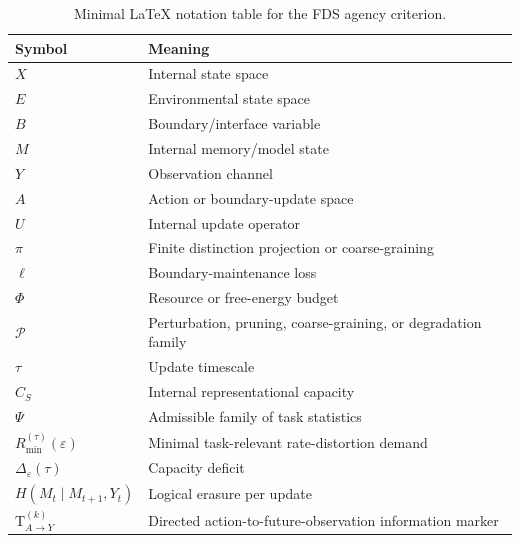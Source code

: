 \documentclass[10pt,a4paper,twocolumn,aps,prl]{revtex4-2}
\newcommand{\TE}{\mathrm{T}}
\begin{document}
\begin{table}[ht]
\centering
\small
\renewcommand{\arraystretch}{1.2}
\begin{tabular}{ll}
\toprule
\parbox[t]{2cm}{\raggedright\textbf{Symbol}} & \parbox[t]{9cm}{\raggedright\textbf{Meaning}}\\
\midrule
\midrule
\parbox[t]{2cm}{\raggedright $X$} & \parbox[t]{9cm}{\raggedright Internal state space}\\
\parbox[t]{2cm}{\raggedright $E$} & \parbox[t]{9cm}{\raggedright Environmental state space}\\
\parbox[t]{2cm}{\raggedright $B$} & \parbox[t]{9cm}{\raggedright Boundary/interface variable}\\
\parbox[t]{2cm}{\raggedright $M$} & \parbox[t]{9cm}{\raggedright Internal memory/model state}\\
\parbox[t]{2cm}{\raggedright $Y$} & \parbox[t]{9cm}{\raggedright Observation channel}\\
\parbox[t]{2cm}{\raggedright $A$} & \parbox[t]{9cm}{\raggedright Action or boundary-update space}\\
\parbox[t]{2cm}{\raggedright $U$} & \parbox[t]{9cm}{\raggedright Internal update operator}\\
\parbox[t]{2cm}{\raggedright $\pi$} & \parbox[t]{9cm}{\raggedright Finite distinction projection or coarse-graining}\\
\parbox[t]{2cm}{\raggedright $\ell$} & \parbox[t]{9cm}{\raggedright Boundary-maintenance loss}\\
\parbox[t]{2cm}{\raggedright $\Phi$} & \parbox[t]{9cm}{\raggedright Resource or free-energy budget}\\
\parbox[t]{2cm}{\raggedright $\mathcal{P}$} & \parbox[t]{9cm}{\raggedright Perturbation, pruning, coarse-graining, or degradation family}\\
\parbox[t]{2cm}{\raggedright $\tau$} & \parbox[t]{9cm}{\raggedright Update timescale}\\
\parbox[t]{2cm}{\raggedright $C_S$} & \parbox[t]{9cm}{\raggedright Internal representational capacity}\\
\parbox[t]{2cm}{\raggedright $\Psi$} & \parbox[t]{9cm}{\raggedright Admissible family of task statistics}\\
\parbox[t]{2cm}{\raggedright $R_{\min}^{(\tau)}(\varepsilon)$} & \parbox[t]{9cm}{\raggedright Minimal task-relevant rate-distortion demand}\\
\parbox[t]{2cm}{\raggedright $\Delta_{\varepsilon}(\tau)$} & \parbox[t]{9cm}{\raggedright Capacity deficit}\\
$H(M_t\mid M_{t+1},Y_t)$ & Logical erasure per update\\
$\TE_{A\to Y}^{(k)}$ & Directed action-to-future-observation information marker\\
\bottomrule
\end{tabular}
\caption{Minimal LaTeX notation table for the FDS agency criterion.}
\end{table}
\end{document}

